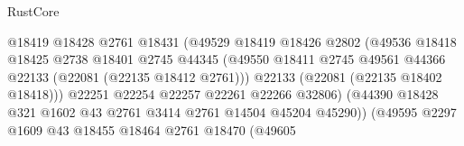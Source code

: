 \begin{lexlean}{RustCore}
\begin{coremodule}
                                          @18419
                                          @18428
                                          @2761
                                          @18431
                                          (@49529
                                            @18419
                                            @18426
                                            @2802
                                            (@49536
                                              @18418
                                              @18425
                                              @2738
                                              @18401
                                              @2745
                                              @44345
                                              (@49550
                                                @18411
                                                @2745
                                                @49561
                                                @44366
                                                @22133
                                                (@22081 (@22135 @18412 @2761)))
                                              @22133
                                              (@22081 (@22135 @18402 @18418)))
                                            @22251
                                            @22254
                                            @22257
                                            @22261
                                            @22266
                                            @32806)
                                          (@44390
                                            @18428
                                            @321
                                            @1602
                                            @43
                                            @2761
                                            @3414
                                            @2761
                                            @14504
                                            @45204
                                            @45290))
                                        (@49595
                                          @2297
                                          @1609
                                          @43
                                          @18455
                                          @18464
                                          @2761
                                          @18470
                                          (@49605

\end{coremodule}
\end{lexlean}
